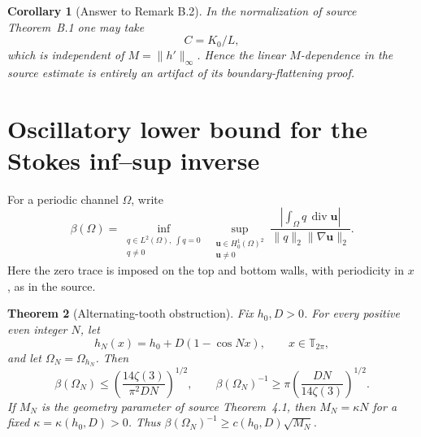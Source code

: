 \documentclass[11pt]{article}
\newtheorem{theorem}{Theorem}
\newtheorem{corollary}[theorem]{Corollary}
\newcommand{\Om}{\Omega}
\newcommand{\T}{\mathbb T}
\begin{document}
\begin{corollary}[Answer to Remark B.2]
In the normalization of source Theorem~B.1 one may take
\[
 C=K_0/L,
\]
which is independent of \(M=\|h'\|_\infty\).  Hence the linear
\(M\)-dependence in the source estimate is entirely an artifact of its
boundary-flattening proof.
\end{corollary}

\section{Oscillatory lower bound for the Stokes inf--sup inverse}

For a periodic channel \(\Om\), write
\[
 \beta(\Om)=\inf_{\substack{q\in L^2(\Om),\ \int q=0\\q\ne0}}
 \ \sup_{\substack{\mathbf u\in H^1_0(\Om)^2\\\mathbf u\ne0}}
 \frac{\left|\int_\Om q\,\operatorname{div}\mathbf u\right|}
 {\|q\|_2\|\nabla\mathbf u\|_2}.
\]
Here the zero trace is imposed on the top and bottom walls, with periodicity
in \(x\), as in the source.

\begin{theorem}[Alternating-tooth obstruction]\label{thm:infsup}
Fix \(h_0,D>0\).  For every positive even integer \(N\), let
\[
 h_N(x)=h_0+D(1-\cos Nx),\qquad x\in\T_{2\pi},
\]
and let \(\Om_N=\Om_{h_N}\).  Then
\[
 \beta(\Om_N)\le
 \left(\frac{14\zeta(3)}{\pi^2DN}\right)^{1/2},
 \qquad
 \beta(\Om_N)^{-1}\ge
 \pi\left(\frac{DN}{14\zeta(3)}\right)^{1/2}.
\]
If \(M_N\) is the geometry parameter of source Theorem~4.1, then
\(M_N=\kappa N\) for a fixed \(\kappa=\kappa(h_0,D)>0\).  Thus
\(\beta(\Om_N)^{-1}\ge c(h_0,D)\sqrt{M_N}\).
\end{theorem}
\end{document}
